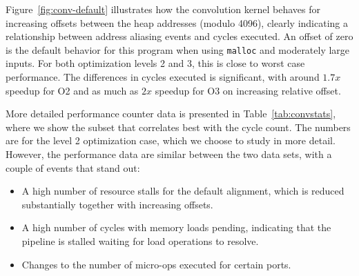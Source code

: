 \documentclass[10pt, conference, compsocconf]{IEEEtran}
\begin{document}
Figure~\ref{fig:conv-default} illustrates how the convolution kernel behaves for increasing offsets between the heap addresses (modulo 4096), clearly indicating a relationship between address aliasing events and cycles executed.
An offset of zero is the default behavior for this program when using \texttt{malloc} and moderately large inputs.
For both optimization levels 2 and 3, this is close to worst case performance.
The differences in cycles executed is significant, with around $1.7x$ speedup for O2 and as much as $2x$ speedup for O3 on increasing relative offset.

More detailed performance counter data is presented in Table~\ref{tab:convstats}, where we show the subset that correlates best with the cycle count.
The numbers are for the level 2 optimization case, which we choose to study in more detail.
However, the performance data are similar between the two data sets, with a couple of events that stand out:
\begin{itemize}
  \item A high number of resource stalls for the default alignment, which is reduced substantially together with increasing offsets. 
  \item A high number of cycles with memory loads pending, indicating that the pipeline is stalled waiting for load operations to resolve.
  \item Changes to the number of micro-ops executed for certain ports.
\end{itemize}
\end{document}
